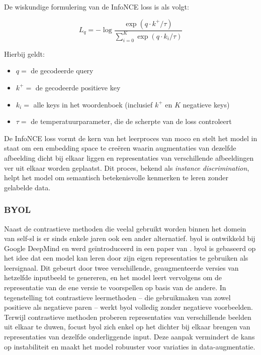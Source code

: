 De wiskundige formulering van de InfoNCE loss is als volgt:

$$
L_q = - \log \frac{\exp{(q \cdot k^+ / {\tau})}}{\sum_{i=0}^{K}\exp{(q \cdot k_i / {\tau})}}
$$

Hierbij geldt:

\begin{itemize}
    \item $q =$ de gecodeerde query
    \item $k^+ =$ de gecodeerde positieve key
    \item $k_i =$ alle keys in het woordenboek (inclusief $k^+$ en $K$ negatieve keys)
    \item $\tau =$ de temperatuurparameter, die de scherpte van de loss controleert  
\end{itemize}

De InfoNCE loss vormt de kern van het leerproces van \gls{moco} en stelt het model in staat om een embedding space te creëren waarin augmentaties van dezelfde afbeelding dicht bij elkaar liggen en representaties van verschillende afbeeldingen ver uit elkaar worden geplaatst. Dit proces, bekend als \emph{instance discrimination}, helpt het model om semantisch betekenisvolle kenmerken te leren zonder gelabelde data.

\subsubsection{BYOL}

\autocite{Adaloglou_2022}

Naast de contrastieve methoden die veelal gebruikt worden binnen het domein van \gls{self-sl} is er sinds enkele jaren ook een ander alternatief. \gls{byol} is ontwikkeld bij Google DeepMind en werd geïntroduceerd in een paper van \textcite{Grill_2020}. \gls{byol} is gebaseerd op het idee dat een model kan leren door zijn eigen representaties te gebruiken als leersignaal. Dit gebeurt door twee verschillende, geaugmenteerde versies van hetzelfde inputbeeld te genereren, en het model leert vervolgens om de representatie van de ene versie te voorspellen op basis van de andere. In tegenstelling tot contrastieve leermethoden -- die gebruikmaken van zowel positieve als negatieve paren -- werkt \gls{byol} volledig zonder negatieve voorbeelden. Terwijl contrastieve methoden proberen representaties van verschillende beelden uit elkaar te duwen, focust \gls{byol} zich enkel op het dichter bij elkaar brengen van representaties van dezelfde onderliggende input. Deze aanpak vermindert de kans op instabiliteit en maakt het model robuuster voor variaties in data-augmentatie. \\

